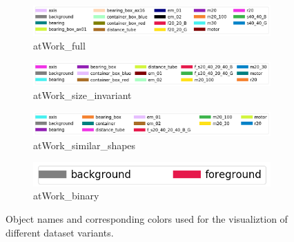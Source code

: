 	\begin{figure}[h]
		\centering
		\begin{subfigure}{1\textwidth}
			\centering
			\includegraphics[width=1\linewidth]{images/sample_predictions/full_guide}
			\caption{atWork\_full}
		\end{subfigure}
		\begin{subfigure}{1\textwidth}
			\centering
			\includegraphics[width=1\linewidth]{images/sample_predictions/size_guide}
			\caption{atWork\_size\_invariant}
		\end{subfigure}
		\begin{subfigure}{1\textwidth}
			\centering
			\includegraphics[width=1\linewidth]{images/sample_predictions/shape_guide}
			\caption{atWork\_similar\_shapes}
		\end{subfigure}
		\begin{subfigure}{1\textwidth}
			\centering
			\includegraphics[width=.5\linewidth]{images/sample_predictions/binary_guide}
			\caption{atWork\_binary}
		\end{subfigure}
		\caption{Object names and corresponding colors used for the visualiztion of different dataset variants.}
		\label{Fig:guide}
	\end{figure}
	
